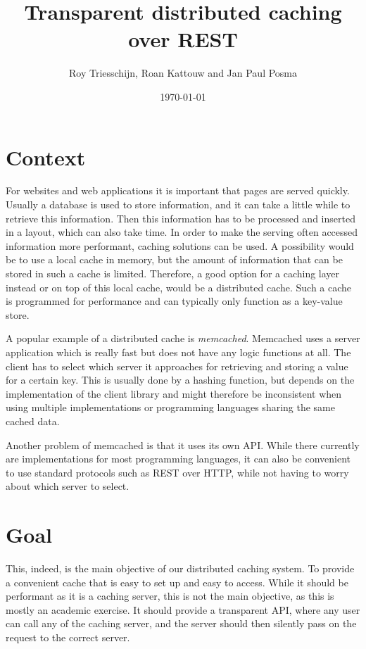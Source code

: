 \documentclass[12pt]{article}
\begin{document}
\author{Roy Triesschijn, Roan Kattouw and Jan Paul Posma}
\date{\today}
\title{Transparent distributed caching over REST}

\maketitle

\section*{Context}
For websites and web applications it is important that pages are served quickly. Usually a database is used to store information, and it can take a little while to retrieve this information. Then this information has to be processed and inserted in a layout, which can also take time. In order to make the serving often accessed information more performant, caching solutions can be used. A possibility would be to use a local cache in memory, but the amount of information that can be stored in such a cache is limited. Therefore, a good option for a caching layer instead or on top of this local cache, would be a distributed cache. Such a cache is programmed for performance and can typically only function as a key-value store.

A popular example of a distributed cache is \emph{memcached}. Memcached uses a server application which is really fast but does not have any logic functions at all. The client has to select which server it approaches for retrieving and storing a value for a certain key. This is usually done by a hashing function, but depends on the implementation of the client library and might therefore be inconsistent when using multiple implementations or programming languages sharing the same cached data.

Another problem of memcached is that it uses its own API. While there currently are implementations for most programming languages, it can also be convenient to use standard protocols such as REST over HTTP, while not having to worry about which server to select.

\section*{Goal}
This, indeed, is the main objective of our distributed caching system. To provide a convenient cache that is easy to set up and easy to access. While it should be performant as it is a caching server, this is not the main objective, as this is mostly an academic exercise. It should provide a transparent API, where any user can call any of the caching server, and the server should then silently pass on the request to the correct server.
\end{document}
